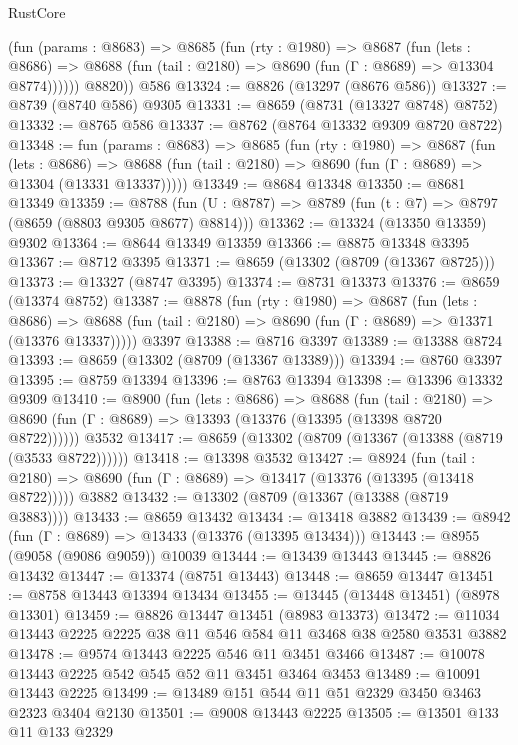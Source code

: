 \begin{lexlean}{RustCore}
\begin{coremodule}
          (fun (params : @8683) =>
          @8685
            (fun (rty : @1980) =>
            @8687
              (fun (lets : @8686) =>
              @8688 (fun (tail : @2180) => @8690 (fun (Γ : @8689) => @13304 @8774))))))
        @8820))
    @586
@13324 := @8826 (@13297 (@8676 @586))
@13327 := @8739 (@8740 @586) @9305
@13331 := @8659 (@8731 (@13327 @8748) @8752)
@13332 := @8765 @586
@13337 := @8762 (@8764 @13332 @9309 @8720 @8722)
@13348 := fun (params : @8683) =>
  @8685
    (fun (rty : @1980) =>
    @8687
      (fun (lets : @8686) =>
      @8688 (fun (tail : @2180) => @8690 (fun (Γ : @8689) => @13304 (@13331 @13337)))))
@13349 := @8684 @13348
@13350 := @8681 @13349
@13359 := @8788 (fun (U : @8787) => @8789 (fun (t : @7) => @8797 (@8659 (@8803 @9305 @8677) @8814)))
@13362 := @13324 (@13350 @13359) @9302
@13364 := @8644 @13349 @13359
@13366 := @8875 @13348 @3395
@13367 := @8712 @3395
@13371 := @8659 (@13302 (@8709 (@13367 @8725)))
@13373 := @13327 (@8747 @3395)
@13374 := @8731 @13373
@13376 := @8659 (@13374 @8752)
@13387 := @8878
    (fun (rty : @1980) =>
    @8687
      (fun (lets : @8686) =>
      @8688 (fun (tail : @2180) => @8690 (fun (Γ : @8689) => @13371 (@13376 @13337)))))
    @3397
@13388 := @8716 @3397
@13389 := @13388 @8724
@13393 := @8659 (@13302 (@8709 (@13367 @13389)))
@13394 := @8760 @3397
@13395 := @8759 @13394
@13396 := @8763 @13394
@13398 := @13396 @13332 @9309
@13410 := @8900
    (fun (lets : @8686) =>
    @8688
      (fun (tail : @2180) =>
      @8690 (fun (Γ : @8689) => @13393 (@13376 (@13395 (@13398 @8720 @8722))))))
    @3532
@13417 := @8659 (@13302 (@8709 (@13367 (@13388 (@8719 (@3533 @8722))))))
@13418 := @13398 @3532
@13427 := @8924
    (fun (tail : @2180) => @8690 (fun (Γ : @8689) => @13417 (@13376 (@13395 (@13418 @8722)))))
    @3882
@13432 := @13302 (@8709 (@13367 (@13388 (@8719 @3883))))
@13433 := @8659 @13432
@13434 := @13418 @3882
@13439 := @8942 (fun (Γ : @8689) => @13433 (@13376 (@13395 @13434)))
@13443 := @8955 (@9058 (@9086 @9059)) @10039
@13444 := @13439 @13443
@13445 := @8826 @13432
@13447 := @13374 (@8751 @13443)
@13448 := @8659 @13447
@13451 := @8758 @13443 @13394 @13434
@13455 := @13445 (@13448 @13451) (@8978 @13301)
@13459 := @8826 @13447 @13451 (@8983 @13373)
@13472 := @11034 @13443 @2225 @2225 @38 @11 @546 @584 @11 @3468 @38 @2580 @3531 @3882
@13478 := @9574 @13443 @2225 @546 @11 @3451 @3466
@13487 := @10078 @13443 @2225 @542 @545 @52 @11 @3451 @3464 @3453
@13489 := @10091 @13443 @2225
@13499 := @13489 @151 @544 @11 @51 @2329 @3450 @3463 @2323 @3404 @2130
@13501 := @9008 @13443 @2225
@13505 := @13501 @133 @11 @133 @2329

\end{coremodule}
\end{lexlean}
